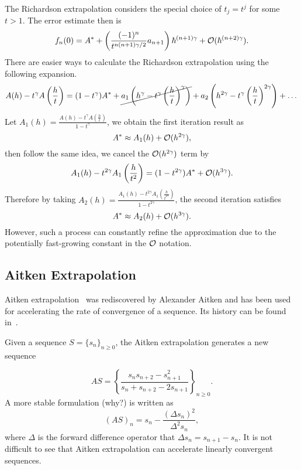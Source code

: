 The Richardson extrapolation considers the special choice of $t_j = t^j$ for some $t > 1$. The error estimate then is 
\begin{equation}
    f_n(0) = A^{\ast} + \left(\frac{(-1)^n}{t^{n(n+1)\gamma/2}} a_{n+1}\right) \hbar^{(n+1)\gamma} + \mathcal O(\hbar^{(n+2)\gamma}).
\end{equation}
There are easier ways to calculate the Richardson extrapolation using the following expansion.
\begin{equation}
    A(h) - t^{\gamma} A\left(\frac{h}{t}\right) = (1 - t^{\gamma}) A^{\ast} + \cancel{a_1 \left(h^{\gamma} - t^{\gamma} \left(\frac{h}{t}\right)^{\gamma}\right)} + a_2\left(h^{2\gamma} - t^{\gamma}\left(\frac{h}{t}\right)^{2\gamma}\right) +\dots
\end{equation}
Let $A_1(h) = \frac{A(h) - t^{\gamma} A(\frac{h}{t}) }{1 - t^{\gamma}} $, we obtain the first iteration result as 
\begin{equation}
    A^{\ast} \approx A_1(h) + \mathcal O(h^{2\gamma}),
\end{equation}
then follow the same idea, we cancel the $\mathcal O(h^{2\gamma})$ term by
\begin{equation}
    A_1(h) - t^{2\gamma} A_1\left(\frac{h}{t^2}\right) = (1 - t^{2\gamma}) A^{\ast} + \mathcal O(h^{3\gamma}).
\end{equation}
Therefore by taking $A_2(h) = \frac{A_1(h)- t^{2\gamma} A_1(\frac{h}{t^{2\gamma}})}{1 - t^{2\gamma}}$, the second iteration satisfies 
\begin{equation}
    A^{\ast}\approx A_2(h) + \mathcal O(h^{3\gamma}).
\end{equation}
However, such a process can constantly refine the approximation due to the potentially fast-growing constant in the $\mathcal O$ notation.
\subsection{Aitken Extrapolation}
\label{SSec: 3-Ait-Ext}
Aitken extrapolation~\cite{aitken1927xxv} was rediscovered by Alexander Aitken and has been used for accelerating the rate of convergence of a sequence. Its history can be found in~\cite{brezinski2013extrapolation}.

Given a sequence $S = \{s_n\}_{n\ge 0}$, the Aitken extrapolation generates a new sequence 

$$AS = \left\{\frac{s_n s_{n+2} - s_{n+1}^2}{s_n + s_{n+2} - 2 s_{n+1}}\right\}_{n\ge 0}. $$
A more stable formulation (why?) is written as 
$$(AS)_n  = s_n - \frac{(\Delta s_n)^2}{\Delta^2 s_n},$$
where $\Delta$ is the forward difference operator that $\Delta s_n = s_{n+1} - s_n$. It is not difficult to see that Aitken extrapolation can accelerate linearly convergent sequences. 


